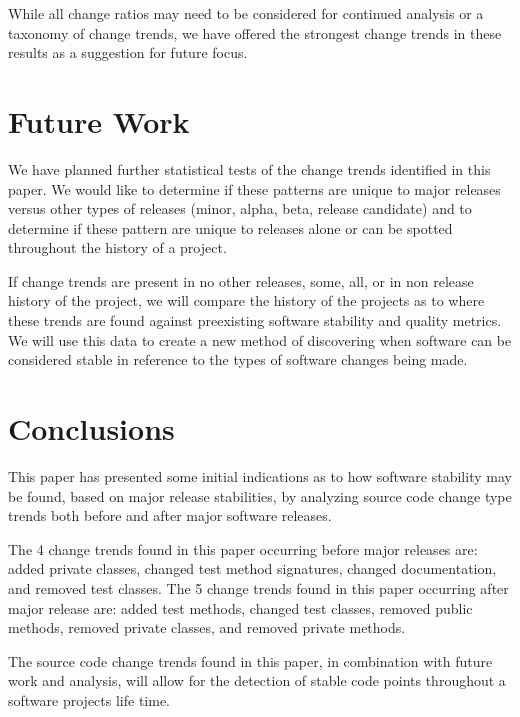 \documentclass{sig-alternate}
\begin{document}
While all change ratios may need to be considered for continued analysis or a taxonomy of change trends, we have offered the strongest
change trends in these results as a suggestion for future focus.

\section{Future Work}
\label{sec:fut}

We have planned further statistical tests of the change trends identified in this paper. We would like to
determine if these patterns are unique to major releases versus other types of releases (minor, alpha, beta, release candidate) and to
determine if these pattern are unique to releases alone or can be spotted throughout the history of a project.

If change trends are present in no other releases, some, all, or in non release history of the project, we will
compare the history of the projects as to where these trends are found against preexisting software stability and quality metrics. We will use this data to
create a new method of discovering when software can be considered stable in reference to the types of software changes being made. 

\section{Conclusions}
\label{sec:con}

This paper has presented some initial indications as to how
software stability may be found, based on major release stabilities, by analyzing source code change type trends both before and after major software
releases. 

The 4 change trends found in this paper occurring before major releases are: added private classes, changed test method signatures, changed documentation,
and removed test classes.
The 5 change trends found in this paper occurring after major release are: added test methods, changed test classes, removed public methods, removed
private classes, and removed private methods.

The source code change trends found in this paper, in combination with future work and analysis, will allow for the detection of stable code
points throughout a software projects life time. 




\end{document}
